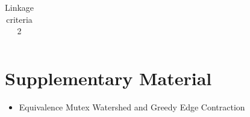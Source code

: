 \documentclass[10pt,twocolumn,letterpaper]{article}
\begin{document}
\begin{table}[t]
\begin{subtable}[t!]{0.98\textwidth}
\begin{tabular}{c | c }




            
        \end{tabular}
        \label{tab:linkage-criteria}
    \end{subtable} 
    \caption{Linkage criteria 2}
\end{table}

{\small


}

\section{Supplementary Material}
\begin{itemize}
\item Equivalence Mutex Watershed and Greedy Edge Contraction
\end{itemize}
\end{document}
